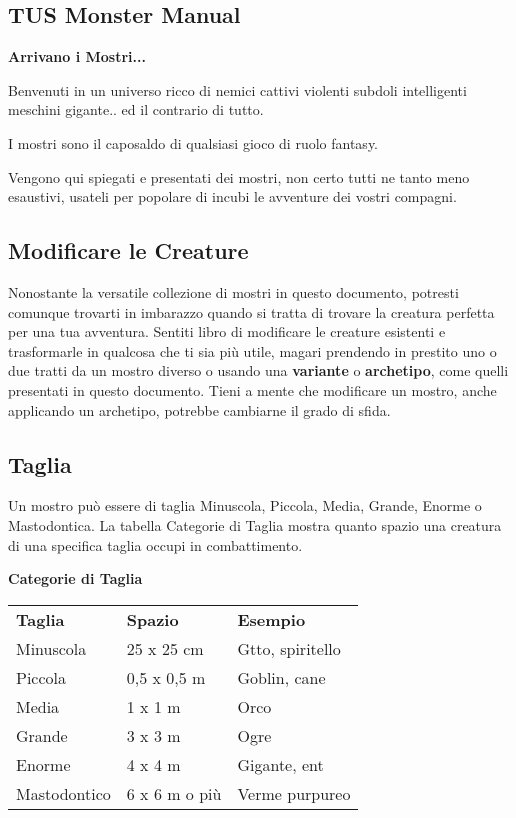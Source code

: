 \begin{multicols}{2}
	
\section{TUS Monster Manual}

\textbf{Arrivano i Mostri...}

Benvenuti in un universo ricco di nemici cattivi violenti subdoli intelligenti meschini gigante.. ed il contrario di tutto.

I mostri sono il caposaldo di qualsiasi gioco di ruolo fantasy.

Vengono qui spiegati e presentati dei mostri, non certo tutti ne tanto meno esaustivi, usateli per popolare di incubi le avventure dei vostri compagni.

\subsection{Modificare le Creature}

Nonostante la versatile collezione di mostri in questo documento, potresti comunque trovarti in imbarazzo quando si tratta di trovare la creatura perfetta per una tua avventura. Sentiti libro di modificare le creature esistenti e trasformarle in qualcosa che ti sia più utile, magari prendendo in prestito uno o due tratti da un mostro diverso o usando una \textbf{variante} o \textbf{archetipo}, come quelli presentati in questo documento. Tieni a mente che modificare un mostro, anche applicando un archetipo, potrebbe cambiarne il grado di sfida. 

\subsection{Taglia}

Un mostro può essere di taglia Minuscola, Piccola, Media, Grande, Enorme o Mastodontica. La tabella Categorie di Taglia mostra quanto spazio una creatura di una specifica taglia occupi in combattimento.

\medskip

\textbf{Categorie di Taglia}

\begin{tabular}{lll}
\toprule
\textbf{Taglia}& \textbf{Spazio} & \textbf{Esempio}\\
Minuscola & 25 x 25 cm& Gtto, spiritello\\
Piccola & 0,5 x 0,5 m & Goblin, cane\\
Media & 1 x 1 m & Orco\\
Grande & 3 x 3 m& Ogre\\
Enorme & 4 x 4 m & Gigante, ent\\
Mastodontico & 6 x 6 m o più&Verme purpureo\\
\end{tabular}


\end{multicols}
